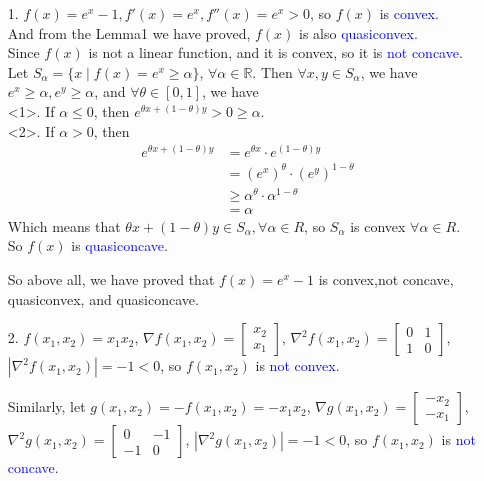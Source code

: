 \begin{itemize}
\item[1.] $f(x)=e^x-1,f'(x)=e^x,f''(x)=e^x>0$, so $f(x)$ is \textcolor{blue}{convex}. \\
And from the Lemma1 we have proved, $f(x)$ is also \textcolor{blue}{quasiconvex}. \\
Since $f(x)$ is not a linear function, and it is convex, so it is \textcolor{blue}{not concave}. \\
Let $S_{\alpha}=\{x\mid f(x)=e^x\geq \alpha\}$, $\forall \alpha\in\mathbb{R}$. Then $\forall x,y\in S_{\alpha}$, we have $e^x\geq \alpha, e^y\geq \alpha$, and $\forall \theta\in[0,1]$, we have \\
<1>. If $\alpha\leq 0$, then $e^{\theta x + (1-\theta)y}>0\geq \alpha$. \\
<2>. If $\alpha>0$, then
\begin{align*}
e^{\theta x + (1-\theta)y} &= e^{\theta x}\cdot e^{(1-\theta)y} \\
&= \left(e^{x}\right)^{\theta}\cdot \left(e^{y}\right)^{1-\theta} \\
&\geq \alpha^{\theta} \cdot \alpha^{1-\theta} \\
&= \alpha
\end{align*}
Which means that $\theta x + (1-\theta)y \in S_{\alpha}, \forall \alpha\in R$, so $S_{\alpha}$ is convex $\forall \alpha\in R$. \\
So $f(x)$ is \textcolor{blue}{quasiconcave}.

So above all, we have proved that $f(x)=e^x-1$ is convex,not concave, quasiconvex, and quasiconcave.


\item[2.] $f(x_1,x_2)=x_1x_2$, $\nabla f(x_1,x_2)=\begin{bmatrix}x_2 \\ x_1\end{bmatrix}$, $\nabla^2 f(x_1,x_2)=\begin{bmatrix}0 & 1 \\ 1 & 0\end{bmatrix}$, $\left|\nabla^2 f(x_1,x_2)\right|=-1<0$, so $f(x_1,x_2)$ is \textcolor{blue}{not convex}.

Similarly, let $g(x_1,x_2)=-f(x_1,x_2)=-x_1x_2$, $\nabla g(x_1,x_2)=\begin{bmatrix}-x_2 \\ -x_1\end{bmatrix}$, $\nabla^2 g(x_1,x_2)=\begin{bmatrix}0 & -1 \\ -1 & 0\end{bmatrix}$, $\left|\nabla^2 g(x_1,x_2)\right|=-1<0$, so $f(x_1,x_2)$ is \textcolor{blue}{not concave}.


\end{itemize}
